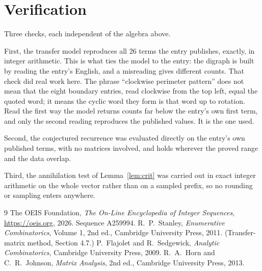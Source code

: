 \documentclass[11pt,a4paper]{article}
\theoremstyle{plain}
\theoremstyle{definition}
\begin{document}
\section{Verification}

Three checks, each independent of the algebra above.

First, the transfer model reproduces all $26$ terms the entry publishes, exactly, in
integer arithmetic. This is what ties the model to the entry: the digraph is built by reading
the entry's English, and a misreading gives different counts. That check did real work here. The phrase ``clockwise perimeter pattern'' does not mean that the eight boundary entries, read clockwise from the top left, equal the quoted word; it means the cyclic word they form is that word up to rotation. Read the first way the model returns counts far below the entry's own first term, and only the second reading reproduces the published values. It is the one used.

Second, the conjectured recurrence was evaluated directly on the entry's own published terms,
with no matrices involved, and holds wherever the proved range and the data overlap.

Third, the annihilation test of Lemma~\ref{lem:crit} was carried out in exact integer
arithmetic on the whole vector rather than on a sampled prefix, so no rounding or sampling
enters anywhere.

\begin{thebibliography}{9}
 The OEIS Foundation, \emph{The On-Line Encyclopedia of Integer
Sequences}, \url{https://oeis.org}, 2026. Sequence A259994.
 R.~P.~Stanley, \emph{Enumerative Combinatorics}, Volume 1, 2nd ed.,
Cambridge University Press, 2011. (Transfer-matrix method, Section 4.7.)
 P.~Flajolet and R.~Sedgewick, \emph{Analytic Combinatorics}, Cambridge
University Press, 2009.
 R.~A.~Horn and C.~R.~Johnson, \emph{Matrix Analysis}, 2nd ed., Cambridge
University Press, 2013.
\end{thebibliography}
\end{document}
